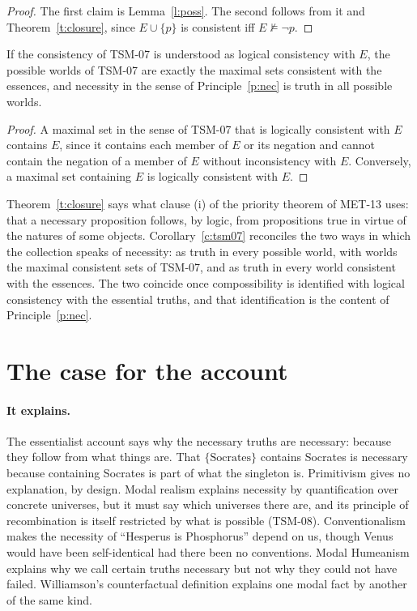 \documentclass{situationist-preprint}
\begin{document}
\begin{proof}
The first claim is Lemma~\ref{l:poss}. The second follows from it and Theorem~\ref{t:closure}, since $E\cup\{p\}$ is consistent iff $E\nvDash\neg p$.
\end{proof}

\begin{corollary}\label{c:tsm07}
If the consistency of TSM-07 is understood as logical consistency with $E$, the possible worlds of TSM-07 are exactly the maximal sets consistent with the essences, and necessity in the sense of Principle~\ref{p:nec} is truth in all possible worlds.
\end{corollary}

\begin{proof}
A maximal set in the sense of TSM-07 that is logically consistent with $E$ contains $E$, since it contains each member of $E$ or its negation and cannot contain the negation of a member of $E$ without inconsistency with $E$. Conversely, a maximal set containing $E$ is logically consistent with $E$.
\end{proof}

Theorem~\ref{t:closure} says what clause (i) of the priority theorem of MET-13 uses: that a necessary proposition follows, by logic, from propositions true in virtue of the natures of some objects. Corollary~\ref{c:tsm07} reconciles the two ways in which the collection speaks of necessity: as truth in every possible world, with worlds the maximal consistent sets of TSM-07, and as truth in every world consistent with the essences. The two coincide once compossibility is identified with logical consistency with the essential truths, and that identification is the content of Principle~\ref{p:nec}.

\section{The case for the account}

\paragraph{It explains.} The essentialist account says why the necessary truths are necessary: because they follow from what things are. That $\{\text{Socrates}\}$ contains Socrates is necessary because containing Socrates is part of what the singleton is. Primitivism gives no explanation, by design. Modal realism explains necessity by quantification over concrete universes, but it must say which universes there are, and its principle of recombination is itself restricted by what is possible (TSM-08). Conventionalism makes the necessity of \enquote{Hesperus is Phosphorus} depend on us, though Venus would have been self-identical had there been no conventions. Modal Humeanism explains why we call certain truths necessary but not why they could not have failed. Williamson's counterfactual definition explains one modal fact by another of the same kind.
\end{document}
